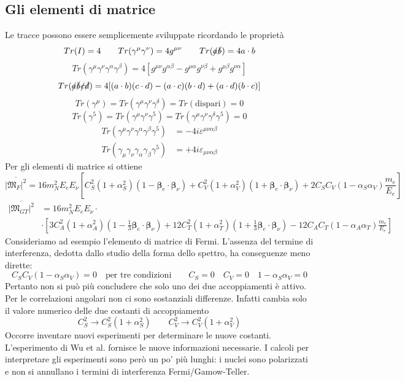 \subsection{Gli elementi di matrice}
Le tracce possono essere semplicemente sviluppate ricordando le proprietà
$$
Tr(I) = 4 \qquad Tr(\gamma^\mu \gamma^\nu) = 4g^{\mu\nu} \qquad Tr(\slashed{a}\slashed{b}) = 4a \cdot b
$$
$$
Tr(\gamma^\mu \gamma^\nu \gamma^\alpha \gamma^\beta) = 4 [g^{\mu\nu}g^{\alpha\beta} - g^{\mu\alpha}g^{\nu\beta} + g^{\mu\beta}g^{\nu\alpha}]
$$
$$
Tr(\slashed{a}\slashed{b}\slashed{c}\slashed{d}) = 4[(a \cdot b)(c \cdot d) - (a \cdot c)(b \cdot d) + (a \cdot d)(b \cdot c)]
$$
$$
Tr(\gamma^\mu) = Tr(\gamma^\mu \gamma^\nu \gamma^\delta) = Tr(\text{dispari}) = 0
$$
$$
Tr(\gamma^5) = Tr(\gamma^\mu \gamma^\nu \gamma^5) = Tr(\gamma^\mu \gamma^\nu \gamma^\delta \gamma^5) = 0
$$
$$
\begin{aligned}
	Tr(\gamma^\mu \gamma^\nu \gamma^\alpha \gamma^\beta \gamma^5) &= -4i\varepsilon^{\mu\nu\alpha\beta} \\
	Tr(\gamma_\mu \gamma_\nu \gamma_\alpha \gamma_\beta \gamma^5) &= +4i\varepsilon_{\mu\nu\alpha\beta}
\end{aligned}
$$
Per gli elementi di matrice si ottiene
$$
\overline{|\mathfrak{M}_F|^2} = 16m_N^2 E_e E_\nu \left[ C_S^2 (1 + \alpha_S^2)(1 - \boldsymbol{\beta}_e \cdot \boldsymbol{\beta}_\nu) + C_V^2 (1 + \alpha_V^2)(1 + \boldsymbol{\beta}_e \cdot \boldsymbol{\beta}_\nu) + 2C_S C_V (1 - \alpha_S \alpha_V) \frac{m_e}{E_e} \right]
$$
$$
\begin{aligned}
	\overline{|\mathfrak{M}_{GT}|^2} &= 16m_N^2 E_e E_\nu \cdot \\
	&\cdot \left[ 3C_A^2 (1 + \alpha_A^2)\left(1 - \frac{1}{3}\boldsymbol{\beta}_e \cdot \boldsymbol{\beta}_\nu \right) + 12C_T^2 (1 + \alpha_T^2)\left(1 + \frac{1}{3}\boldsymbol{\beta}_e \cdot \boldsymbol{\beta}_\nu\right) - 12C_A C_T (1 - \alpha_A \alpha_T) \frac{m_e}{E_e} \right]
\end{aligned}
$$
Consideriamo ad esempio l'elemento di matrice di Fermi. L'assenza del termine di interferenza, dedotta dallo studio della forma dello spettro, ha conseguenze meno dirette:
$$
C_SC_V\left(1-\alpha_S\alpha_V\right)=0 \quad \text{per tre condizioni} \qquad C_S=0 \quad C_V=0 \quad 1-\alpha_S\alpha_V=0
$$
Pertanto non si può più concludere che solo uno dei due accoppiamenti è attivo. Per le correlazioni angolari non ci sono sostanziali differenze. Infatti cambia solo il valore numerico delle due costanti di accoppiamento
$$
C_S^2 \to C_S^2 (1 + \alpha_S^2) \qquad C_V^2 \to C_V^2 (1 + \alpha_V^2)
$$
Occorre inventare nuovi esperimenti per determinare le nuove costanti. L'esperimento di Wu et al. fornisce le nuove informazioni necessarie. I calcoli per interpretare gli esperimenti sono però un po' più lunghi: i nuclei sono polarizzati e non si annullano i termini di interferenza Fermi/Gamow-Teller.
